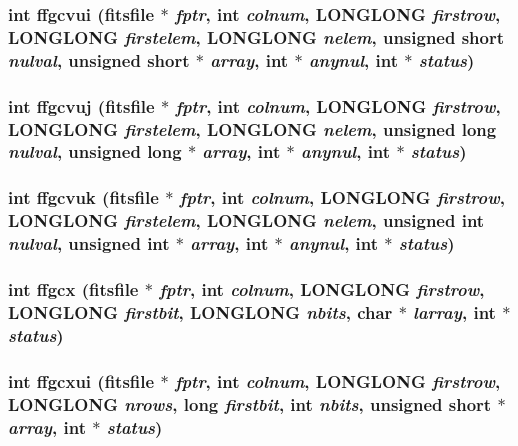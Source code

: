 \subsubsection{\setlength{\rightskip}{0pt plus 5cm}int ffgcvui (\bf{fitsfile} $\ast$ {\em fptr}, int {\em colnum}, \bf{LONGLONG} {\em firstrow}, \bf{LONGLONG} {\em firstelem}, \bf{LONGLONG} {\em nelem}, unsigned short {\em nulval}, unsigned short $\ast$ {\em array}, int $\ast$ {\em anynul}, int $\ast$ {\em status})}\label{fitsio_8h_4370d87e5941c7d816961ca76b625dfc}


\subsubsection{\setlength{\rightskip}{0pt plus 5cm}int ffgcvuj (\bf{fitsfile} $\ast$ {\em fptr}, int {\em colnum}, \bf{LONGLONG} {\em firstrow}, \bf{LONGLONG} {\em firstelem}, \bf{LONGLONG} {\em nelem}, unsigned long {\em nulval}, unsigned long $\ast$ {\em array}, int $\ast$ {\em anynul}, int $\ast$ {\em status})}\label{fitsio_8h_0016dfa0f5bcc9c887e899ed6d4562a4}


\subsubsection{\setlength{\rightskip}{0pt plus 5cm}int ffgcvuk (\bf{fitsfile} $\ast$ {\em fptr}, int {\em colnum}, \bf{LONGLONG} {\em firstrow}, \bf{LONGLONG} {\em firstelem}, \bf{LONGLONG} {\em nelem}, unsigned int {\em nulval}, unsigned int $\ast$ {\em array}, int $\ast$ {\em anynul}, int $\ast$ {\em status})}\label{fitsio_8h_39e9176ab61410b852bcce4e4e7d4fae}


\subsubsection{\setlength{\rightskip}{0pt plus 5cm}int ffgcx (\bf{fitsfile} $\ast$ {\em fptr}, int {\em colnum}, \bf{LONGLONG} {\em firstrow}, \bf{LONGLONG} {\em firstbit}, \bf{LONGLONG} {\em nbits}, char $\ast$ {\em larray}, int $\ast$ {\em status})}\label{fitsio_8h_5442835d3053104e266593e562f35ed6}


\subsubsection{\setlength{\rightskip}{0pt plus 5cm}int ffgcxui (\bf{fitsfile} $\ast$ {\em fptr}, int {\em colnum}, \bf{LONGLONG} {\em firstrow}, \bf{LONGLONG} {\em nrows}, long {\em firstbit}, int {\em nbits}, unsigned short $\ast$ {\em array}, int $\ast$ {\em status})}\label{fitsio_8h_b19b10366f2657d82b522b1fb0dd7543}


